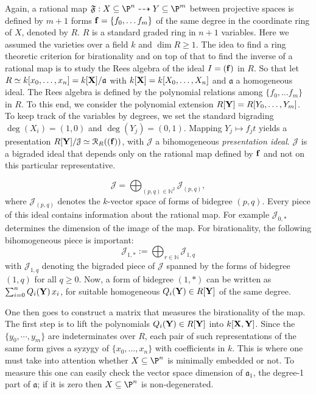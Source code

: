 \documentclass[11pt]{amsart}%
\numberwithin{equation}{theorem}
\def\ff{{\bf f}}
\def\XX{{\bf X}}
\def\YY{{\bf Y}}
\renewcommand{\:}{\colon}
\theoremstyle{theorem}
\begin{document}
Again, a rational map $\mathfrak{F}:X\subseteq \P^n\dasharrow Y \subseteq \P^m$ between projective spaces is defined by $m+1$ forms $\ff=\{f_0,\ldots f_m\}$ of the same degree in the coordinate ring of $X$, denoted by  $R$. $R$ is a standard graded ring in $n+1$ variables. Here we assumed the varieties over a field $k$ and  $\dim R\geq 1$.
The idea to find a ring theoretic criterion for birationality and on top of that to find the inverse of a rational map is to study the Rees algebra of the ideal $I=(\ff)$ in $R$.
So that let  $R\simeq k[x_0,\ldots, x_n]=k[\XX]/\mathfrak{a}$ with $k[\XX]=k[X_0,\ldots, X_n]$ and $\mathfrak{a}$ a homogeneous ideal. The Rees algebra is defined by the polynomial relations among $\{f_0,\ldots f_m\}$ in $R$. To this end, we consider the polynomial extension $R[\YY]=R[Y_0,\ldots,Y_m]$. To keep track of the variables by degrees, we set the standard  bigrading $\deg(X_i)=(1,0)$ and $\deg(Y_j)=(0,1)$. Mapping $Y_j\mapsto f_jt$ yields
a presentation $R[\YY]/\mathcal{J}\simeq {\mathcal R}_R((\ff))$, with $\mathcal{J}$ a bihomogeneous {\em presentation
ideal}.
$\mathcal{J}$ is a bigraded ideal that depends only on the rational map defined by $\ff$
and not on this particular representative.



$${\mathcal J}=\bigoplus_{(p,q)\in \mathbb{N}^2} {\mathcal J}_{(p,q)},$$
where ${\mathcal J}_{(p,q)}$ denotes the $k$-vector space of forms of bidegree $(p,q)$.
Every piece of this ideal contains information about the rational map. For example ${\mathcal J}_{0,*}$ determines the dimension of the image of the map.
For birationality, the following bihomogeneous piece is  important:
$${\mathcal J}_{1,*}:=\bigoplus_{r\in\mathbb{N}} {\mathcal J}_{1,q}$$
with ${\mathcal J}_{1,q}$ denoting the bigraded piece of ${\mathcal J}$ spanned by the forms of bidegree
 $(1,q)$ for all $q\geq 0$. Now, a form of bidegree $(1,*)$ can be written as $\sum_{i=0}^n Q_i(\YY)\,x_i$, for suitable homogeneous $Q_i(\YY)\in  R[\YY]$
of the same degree.

One then goes to construct a matrix that  measures the birationality of the map. The first step is to lift the polynomials $Q_i(\YY)\in  R[\YY]$ into $k[\XX,\YY]$.
Since the $\{y_0,\cdots,y_m\}$ are indeterminates over $R$, each pair of such representations of the same form gives a syzygy of $\{x_0,\ldots,x_n\}$
with coefficients in $k$.  This is where one must take into attention whether $X\subseteq \P^n$ is minimally embedded  or not. To measure this one can easily check the vector space dimension of ${\mathfrak a}_1$, the degree-1 part of $\mathfrak a$; if it is zero  then $X\subseteq \P^n$ is non-degenerated.
\end{document}
